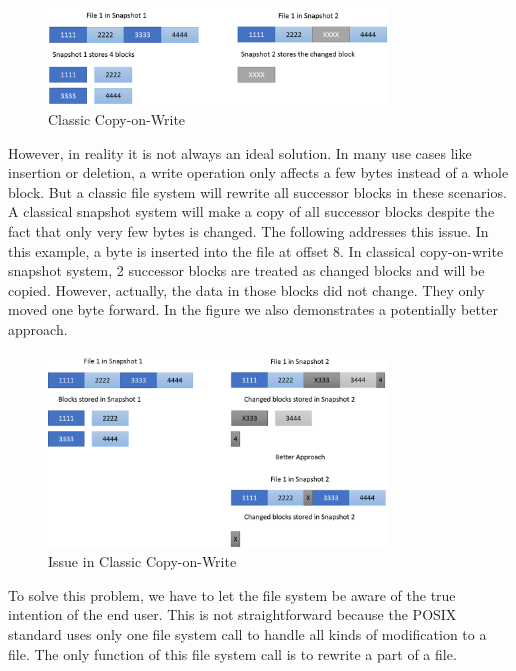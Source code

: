 \begin{figure}[hbtp]
\centering
\includegraphics[width=0.8\textwidth]{Chapter-4/figs/fig4.png}
\caption{Classic Copy-on-Write}
\label{fig:classic_cow}
\end{figure}

    However, in reality it is not always an ideal solution. In many use cases like insertion or deletion, a write operation only affects a few bytes instead of a whole block. But a classic file system will rewrite all successor blocks in these scenarios. A classical snapshot system will make a copy of all successor blocks despite the fact that only very few bytes is changed. The following  addresses this issue. In this example, a byte is inserted into the file at offset 8. In classical copy-on-write snapshot system, 2 successor blocks are treated as changed blocks and will be copied. However, actually, the data in those blocks did not change. They only moved one byte forward. In the figure we also demonstrates a potentially better approach.

\begin{figure}[hbtp]
\centering
\includegraphics[width=0.8\textwidth]{Chapter-4/figs/fig5.png}
\caption{Issue in Classic Copy-on-Write}
\label{fig:issue_classic_cow}
\end{figure}
 
    To solve this problem, we have to let the file system be aware of the true intention of the end user. This is not straightforward because the POSIX standard uses only one file system call to handle all kinds of modification to a file. The only function of this file system call is to rewrite a part of a file.
    

